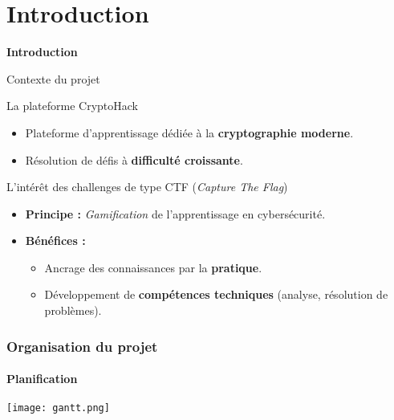 
\section{Introduction}

\begin{frame}
    \centering
    \Huge{\bfseries Introduction}
\end{frame}

\begin{frame}{Contexte du projet}

    \begin{block}{La plateforme CryptoHack}
        \begin{itemize}
            \item Plateforme d'apprentissage dédiée à la \textbf{cryptographie moderne}.
            \item Résolution de défis à \textbf{difficulté croissante}.
        \end{itemize}
    \end{block}

    \vspace{0.5cm}

    \begin{alertblock}{L'intérêt des challenges de type CTF (\textit{Capture The Flag})}
        \begin{itemize}
            \item \textbf{Principe :} \textit{Gamification} de l'apprentissage en cybersécurité.
            \item \textbf{Bénéfices :}
                \begin{itemize}
                    \item Ancrage des connaissances par la \textbf{pratique}.
                    \item Développement de \textbf{compétences techniques} (analyse, résolution de problèmes).
                \end{itemize}
        \end{itemize}
    \end{alertblock}

\end{frame}

\begin{frame}
    \frametitle{Organisation du projet}
    \framesubtitle{Planification}
    \centering
    \texttt{[image: gantt.png]}
\end{frame}

